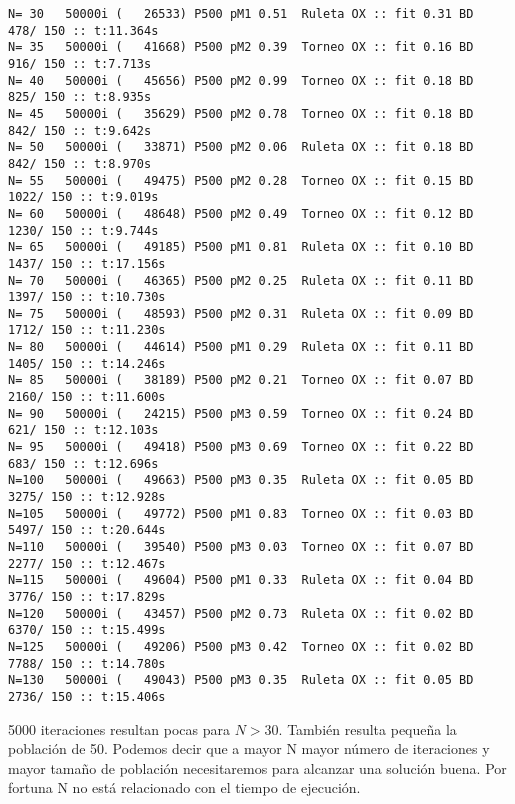 \documentclass[10pt]{article}
\begin{document}
\begin{verbatim}
N= 30   50000i (   26533) P500 pM1 0.51  Ruleta OX :: fit 0.31 BD  478/ 150 :: t:11.364s
N= 35   50000i (   41668) P500 pM2 0.39  Torneo OX :: fit 0.16 BD  916/ 150 :: t:7.713s
N= 40   50000i (   45656) P500 pM2 0.99  Torneo OX :: fit 0.18 BD  825/ 150 :: t:8.935s
N= 45   50000i (   35629) P500 pM2 0.78  Torneo OX :: fit 0.18 BD  842/ 150 :: t:9.642s
N= 50   50000i (   33871) P500 pM2 0.06  Ruleta OX :: fit 0.18 BD  842/ 150 :: t:8.970s
N= 55   50000i (   49475) P500 pM2 0.28  Torneo OX :: fit 0.15 BD 1022/ 150 :: t:9.019s
N= 60   50000i (   48648) P500 pM2 0.49  Torneo OX :: fit 0.12 BD 1230/ 150 :: t:9.744s
N= 65   50000i (   49185) P500 pM1 0.81  Ruleta OX :: fit 0.10 BD 1437/ 150 :: t:17.156s
N= 70   50000i (   46365) P500 pM2 0.25  Ruleta OX :: fit 0.11 BD 1397/ 150 :: t:10.730s
N= 75   50000i (   48593) P500 pM2 0.31  Ruleta OX :: fit 0.09 BD 1712/ 150 :: t:11.230s
N= 80   50000i (   44614) P500 pM1 0.29  Ruleta OX :: fit 0.11 BD 1405/ 150 :: t:14.246s
N= 85   50000i (   38189) P500 pM2 0.21  Torneo OX :: fit 0.07 BD 2160/ 150 :: t:11.600s
N= 90   50000i (   24215) P500 pM3 0.59  Torneo OX :: fit 0.24 BD  621/ 150 :: t:12.103s
N= 95   50000i (   49418) P500 pM3 0.69  Torneo OX :: fit 0.22 BD  683/ 150 :: t:12.696s
N=100   50000i (   49663) P500 pM3 0.35  Ruleta OX :: fit 0.05 BD 3275/ 150 :: t:12.928s
N=105   50000i (   49772) P500 pM1 0.83  Torneo OX :: fit 0.03 BD 5497/ 150 :: t:20.644s
N=110   50000i (   39540) P500 pM3 0.03  Torneo OX :: fit 0.07 BD 2277/ 150 :: t:12.467s
N=115   50000i (   49604) P500 pM1 0.33  Ruleta OX :: fit 0.04 BD 3776/ 150 :: t:17.829s
N=120   50000i (   43457) P500 pM2 0.73  Ruleta OX :: fit 0.02 BD 6370/ 150 :: t:15.499s
N=125   50000i (   49206) P500 pM3 0.42  Torneo OX :: fit 0.02 BD 7788/ 150 :: t:14.780s
N=130   50000i (   49043) P500 pM3 0.35  Ruleta OX :: fit 0.05 BD 2736/ 150 :: t:15.406s
\end{verbatim}
5000 iteraciones resultan pocas para $N>30$. También resulta pequeña la población de 50.
Podemos decir que a mayor N mayor número de iteraciones y mayor tamaño de población necesitaremos para alcanzar una solución buena. Por fortuna N no está relacionado con el tiempo de ejecución.
\end{document}
